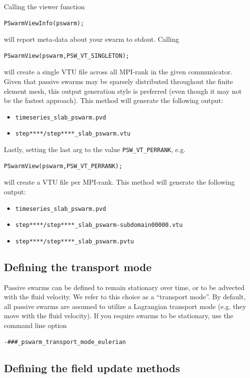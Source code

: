 \documentclass[paper=a4, fontsize=11pt,twoside]{scrartcl}
\begin{document}
{{Calling the viewer function
\begin{lstlisting}
PSwarmViewInfo(pswarm); 
\end{lstlisting}
will report meta-data about your swarm to stdout.
Calling 
\begin{lstlisting}
PSwarmView(pswarm,PSW_VT_SINGLETON);
\end{lstlisting}
will create a single VTU file across all MPI-rank in the given communicator. 
Given that passive swarms may be sparsely distributed throughout the finite element mesh,
this output generation style is preferred (even though it may not be the fastest approach).
This method will generate the following output:
\begin{itemize}
\item \texttt{timeseries\_slab\_pswarm.pvd}
\item \texttt{step****/step****\_slab\_pswarm.vtu}
\end{itemize}
Lastly, setting the last arg to the value \texttt{PSW\_VT\_PERRANK}, e.g.
\begin{lstlisting}
PSwarmView(pswarm,PSW_VT_PERRANK);
\end{lstlisting}
will create a VTU file per MPI-rank. 
This method will generate the following output:
\begin{itemize}
\item \texttt{timeseries\_slab\_pswarm.pvd}
\item \texttt{step****/step****\_slab\_pswarm-subdomain00000.vtu}
\item \texttt{step****/step****\_slab\_pswarm.pvtu}
\end{itemize}




\subsection{Defining the transport mode}

Passive swarms can be defined to remain stationary over time, or to be advected with the fluid velocity.
We refer to this choice as a ``transport mode''. By default, all passive swarms are assumed to utilize a
Lagrangian transport mode (e.g. they move with the fluid velocity). If you require swarms to be stationary,
use the command line option
\begin{lstlisting}
-###_pswarm_transport_mode_eulerian
\end{lstlisting}

\subsection{Defining the field update methods}

}}
\end{document}
